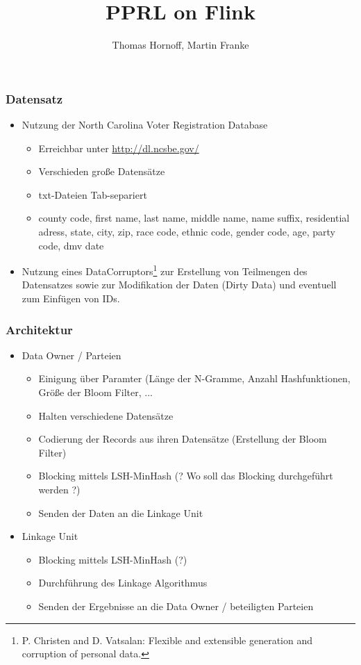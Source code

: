 \documentclass{beamer}
\title{PPRL on Flink}
\author{Thomas Hornoff, Martin Franke}
\begin{document}
	
	\maketitle	

	\begin{frame}
		\frametitle{Datensatz}
		
		\begin{itemize}
			\item Nutzung der North Carolina Voter Registration Database
				\begin{itemize}
					\item Erreichbar unter \url{http://dl.ncsbe.gov/}
					\item Verschieden große Datensätze
					\item txt-Dateien Tab-separiert
					\item county code, first name, last name, middle name, name suffix, residential
					 adress, state, city, zip, race code, ethnic code, gender code, age, party code,
					 dmv date 
				\end{itemize}
			
			\item Nutzung eines DataCorruptors\footnote{P. Christen and D. Vatsalan: Flexible
			 and extensible generation and corruption of personal data.} zur Erstellung von
			 Teilmengen des Datensatzes sowie zur Modifikation der Daten (Dirty Data) und 
			 eventuell zum Einfügen von IDs.
		\end{itemize}	
	
	\end{frame}



    \begin{frame}
    		\frametitle{Architektur}
    		
		\begin{itemize}
			\item Data Owner / Parteien
				\begin{itemize}
					\item Einigung über Paramter (Länge der N-Gramme, Anzahl Hashfunktionen,
					Größe der Bloom Filter, ...
					\item Halten verschiedene Datensätze
					\item Codierung der Records aus ihren Datensätze (Erstellung der Bloom Filter)
					\item Blocking mittels LSH-MinHash 
					(? Wo soll das Blocking durchgeführt werden ?)
					\item Senden der Daten an die Linkage Unit
				\end{itemize}
			\item Linkage Unit
				\begin{itemize}
					\item Blocking mittels LSH-MinHash (?)
					\item Durchführung des Linkage Algorithmus
					\item Senden der Ergebnisse an die Data Owner / beteiligten Parteien
				\end{itemize}	
		\end{itemize}    		  
    \end{frame}
\end{document}
